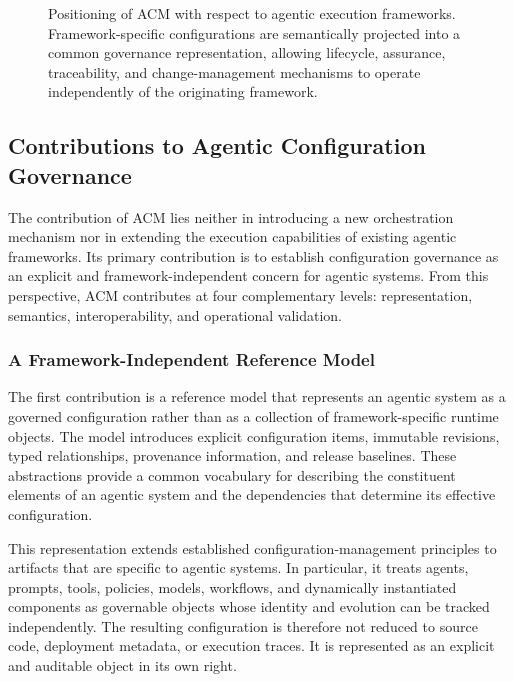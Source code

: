 \documentclass[10pt]{article}
\begin{document}
\begin{figure}[t]

    \caption{Positioning of ACM with respect to agentic execution frameworks. Framework-specific configurations are semantically projected into a common governance representation, allowing lifecycle, assurance, traceability, and change-management mechanisms to operate independently of the originating framework.}
    \label{fig:acm_framework_positioning}
\end{figure}

\subsection{Contributions to Agentic Configuration Governance}
\label{sec:governance_contributions}

The contribution of ACM lies neither in introducing a new orchestration mechanism nor in extending the execution capabilities of existing agentic frameworks. Its primary contribution is to establish configuration governance as an explicit and framework-independent concern for agentic systems. From this perspective, ACM contributes at four complementary levels: representation, semantics, interoperability, and operational validation.

\subsubsection{A Framework-Independent Reference Model}

The first contribution is a reference model that represents an agentic system as a governed configuration rather than as a collection of framework-specific runtime objects. The model introduces explicit configuration items, immutable revisions, typed relationships, provenance information, and release baselines. These abstractions provide a common vocabulary for describing the constituent elements of an agentic system and the dependencies that determine its effective configuration.

This representation extends established configuration-management principles to artifacts that are specific to agentic systems. In particular, it treats agents, prompts, tools, policies, models, workflows, and dynamically instantiated components as governable objects whose identity and evolution can be tracked independently. The resulting configuration is therefore not reduced to source code, deployment metadata, or execution traces. It is represented as an explicit and auditable object in its own right.
\end{document}
